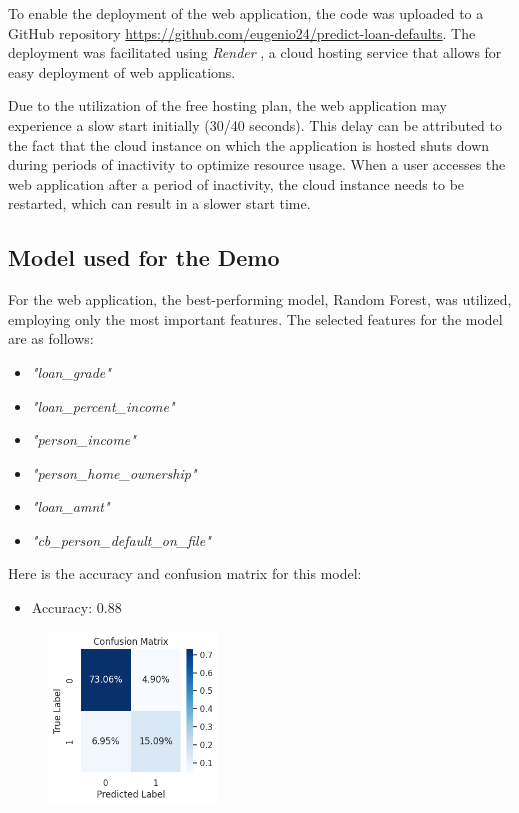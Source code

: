 \documentclass{article}
\begin{document}
To enable the deployment of the web application, the code was uploaded to a GitHub repository \url{https://github.com/eugenio24/predict-loan-defaults}. The deployment was facilitated using \emph{Render} \cite{render}, a cloud hosting service that allows for easy deployment of web applications.

Due to the utilization of the free hosting plan, the web application may experience a slow start initially (30/40 seconds). This delay can be attributed to the fact that the cloud instance on which the application is hosted shuts down during periods of inactivity to optimize resource usage. When a user accesses the web application after a period of inactivity, the cloud instance needs to be restarted, which can result in a slower start time. 

\subsection{Model used for the Demo}\label{subsec:model-demo}
For the web application, the best-performing model, Random Forest, was utilized, employing only the most important features. The selected features for the model are as follows:
\begin{itemize}
    \item \emph{"loan\_grade"}
    \item \emph{"loan\_percent\_income"}
    \item \emph{"person\_income"}
    \item \emph{"person\_home\_ownership"}
    \item \emph{"loan\_amnt"}
    \item \emph{"cb\_person\_default\_on\_file"}
\end{itemize}
Here is the accuracy and confusion matrix for this model:
\begin{itemize}
    \item Accuracy: 0.88
\end{itemize}
\begin{figure}[h!]
    \includegraphics[width=0.4\textwidth]{cleaned_rf_cm.png}
    \label{fig:cleaned_rf_cm}
\end{figure}
\end{document}
